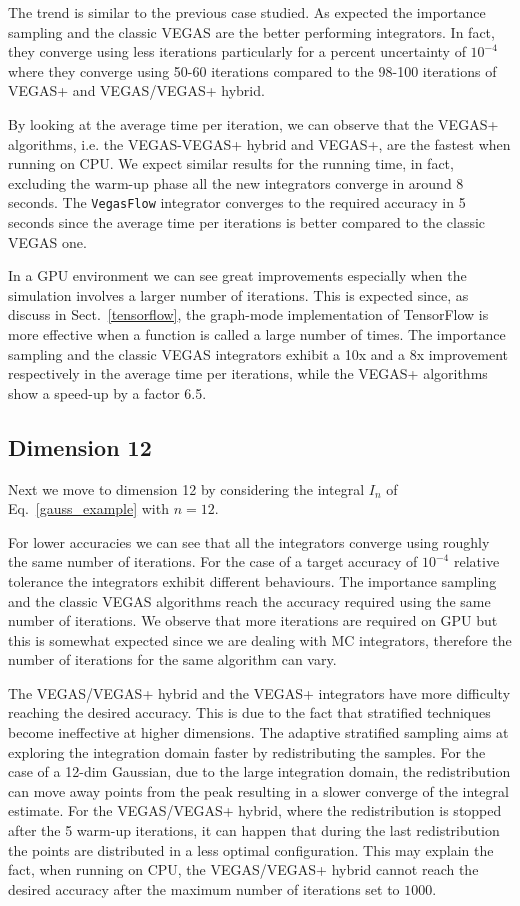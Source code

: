 \documentclass[../main/main.tex]{subfiles}
\begin{document}
The trend is similar to the previous case studied. As expected the importance sampling and the classic VEGAS are the better performing 
integrators. In fact, they converge using less iterations particularly for a percent uncertainty of $10^{-4}$ where they converge using 50-60 iterations compared to the 98-100 iterations of  VEGAS+ and VEGAS/VEGAS+ hybrid.

By looking at the average time per iteration, we can observe that the VEGAS+ algorithms, i.e. the VEGAS-VEGAS+ hybrid and VEGAS+,  are the fastest when running on CPU.  We expect similar results for the running time, in fact, excluding the warm-up phase all the new integrators converge in around 8 seconds. The \texttt{VegasFlow} integrator converges to the required accuracy in 5 seconds since the average time per iterations is better compared to
the classic VEGAS one.

In a GPU environment we can see great improvements especially when the simulation involves a larger number of iterations.
This is expected since, as discuss in Sect.~\ref{tensorflow},  the graph-mode implementation of TensorFlow  is more effective when a function is called a large number of times. The importance sampling and the classic VEGAS integrators exhibit a 10x and a 8x improvement respectively in the average time per iterations, while the VEGAS+ algorithms show a speed-up by a factor 6.5.

 
 \subsection{Dimension 12}
 Next we move to dimension 12 by considering the integral $I_n$ of Eq.~\ref{gauss_example} with $n = 12$.
 
 For lower accuracies we can see that all the integrators converge using roughly the same number of iterations. For the case of a target accuracy of $10^{-4}$ relative tolerance the integrators exhibit different behaviours. The importance sampling and the classic VEGAS algorithms reach the accuracy required using the same number of iterations. We observe that more iterations are required on GPU but this is somewhat expected since we are dealing with MC integrators, therefore the number of iterations for the same algorithm can vary.
 
The VEGAS/VEGAS+ hybrid and the VEGAS+ integrators have more difficulty reaching the desired accuracy. This is due to the fact that 
stratified techniques become ineffective at higher dimensions. The adaptive stratified sampling aims at exploring the integration domain faster by redistributing the samples. For the case of a 12-dim Gaussian, due to the large integration domain, the redistribution can move away points from the peak resulting in a slower converge of the integral estimate. 
For the VEGAS/VEGAS+ hybrid, where the redistribution is stopped after the 5 warm-up iterations, it can happen that during the last redistribution the points are distributed in a less optimal configuration. This may explain the fact, when running on CPU, the VEGAS/VEGAS+ hybrid cannot reach the desired accuracy after the maximum number of iterations set to $1000$.
\end{document}
